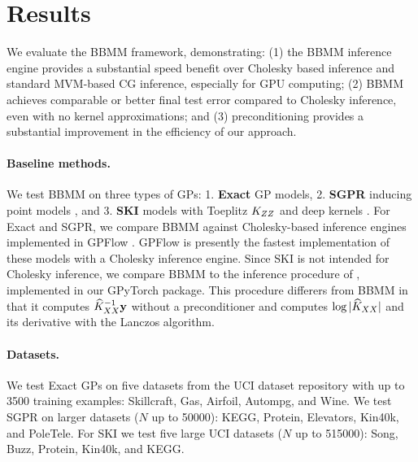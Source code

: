 \section{Results}
\label{sec:bbmm_results}

We evaluate the BBMM framework, demonstrating: (1) the BBMM inference engine provides a substantial speed benefit over Cholesky based inference and standard MVM-based CG inference, especially for GPU computing; (2) BBMM achieves comparable or better final test error compared to Cholesky inference, even with no kernel approximations; and (3) preconditioning provides a substantial improvement in the efficiency of our approach.

\paragraph{Baseline methods.} We test BBMM on three types of GPs:
1. {\bf Exact} GP models,
2. {\bf SGPR} inducing point models \cite{titsias2009variational,hensman2013gaussian},
and 3. {\bf SKI} models with Toeplitz $K_{ZZ}$ and deep kernels \cite{wilson2015kernel,wilson2016deep}.
For Exact and SGPR, we compare BBMM against Cholesky-based inference engines implemented in GPFlow \cite{matthews2017gpflow}.
GPFlow is presently the fastest implementation of these models with a Cholesky inference engine.
Since SKI is not intended for Cholesky inference, we compare BBMM to the inference procedure of \citet{dong2017scalable}, implemented in our GPyTorch package.
This procedure differers from BBMM in that it computes $\widehat{K}_{XX}^{-1} \mathbf{y}$ without a preconditioner and computes $\log \vert \widehat{K}_{XX} \vert$ and its derivative with the Lanczos algorithm.

\paragraph{Datasets.}
We test Exact GPs on five datasets from the UCI dataset repository \cite{asuncion2007uci} with up to 3500 training examples: Skillcraft, Gas, Airfoil, Autompg, and Wine.
We test SGPR on larger datasets ($N$ up to 50000): KEGG, Protein, Elevators, Kin40k, and PoleTele.
For SKI we test five large UCI datasets ($N$ up to 515000): Song, Buzz, Protein, Kin40k, and KEGG.

